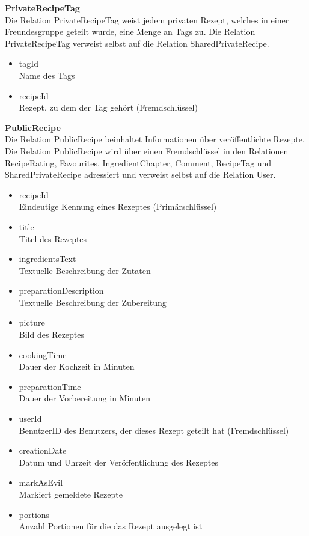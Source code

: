 \textbf{PrivateRecipeTag}\\
Die Relation PrivateRecipeTag weist jedem privaten Rezept, welches in einer Freundesgruppe geteilt wurde, eine Menge an Tags zu. Die Relation PrivateRecipeTag verweist selbst auf die Relation SharedPrivateRecipe.

\begin{itemize}
	\item tagId \\ Name des Tags %
	\item recipeId \\ Rezept, zu dem der Tag gehört (Fremdschlüssel)
\end{itemize}


\textbf{PublicRecipe}\\
Die Relation PublicRecipe beinhaltet Informationen über veröffentlichte Rezepte. Die Relation PublicRecipe wird über einen Fremdschlüssel in den Relationen RecipeRating, Favourites, IngredientChapter, Comment, RecipeTag und SharedPrivateRecipe adressiert und verweist selbst auf die Relation User.

\begin{itemize}
	\item recipeId \\ Eindeutige Kennung eines Rezeptes (Primärschlüssel)
	\item title \\ Titel des Rezeptes
	\item ingredientsText \\ Textuelle Beschreibung der Zutaten
	\item preparationDescription \\ Textuelle Beschreibung der Zubereitung
	\item picture \\ Bild des Rezeptes
	\item cookingTime \\ Dauer der Kochzeit in Minuten
	\item preparationTime \\ Dauer der Vorbereitung in Minuten
	\item userId \\ BenutzerID des Benutzers, der dieses Rezept geteilt hat (Fremdschlüssel)
	\item creationDate \\ Datum und Uhrzeit der Veröffentlichung des Rezeptes
	\item markAsEvil \\ Markiert gemeldete Rezepte
	\item portions \\ Anzahl Portionen für die das Rezept ausgelegt ist
\end{itemize}




